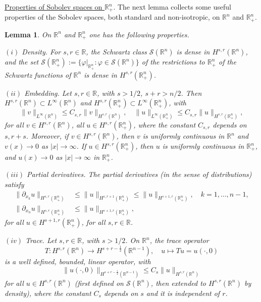 \documentclass[10pt,reqno,a4paper]{article}
\numberwithin{equation}{section}
\theoremstyle{plain}
\newtheorem{lemma}[theorem]{Lemma}
\theoremstyle{definition}
\newcommand{\R}{{\mathbb R}}
\newcommand{\mS}{\mathcal{S}}
\newcommand{\ph}{\varphi}
\newcommand{\pa}{\partial}
\begin{document}
\medskip


\underline{Properties of Sobolev spaces on $\R^n_+$}. 
The next lemma collects some useful properties of the Sobolev spaces, both standard and non-isotropic, 
on $\R^n$ and $\R^n_+$. 


\begin{lemma} \label{lemma:est.tools.R.n.+} 
On $\R^n$ and $\R^n_+$ one has the following properties.

$(i)$ \emph{Density}. 
For $s,r \in \R$, the Schwartz class $\mS(\R^n)$ is dense in $H^{s,r}(\R^n)$, 
and the set $\mS(\R^n_+) := \{ \ph |_{\R^n_+} : \ph \in \mS(\R^n) \}$ 
of the restrictions to $\R^n_+$ of the Schwartz functions of $\R^n$ 
is dense in $H^{s,r}(\R^n_+)$. 

$(ii)$ \emph{Embedding}. 
Let $s,r \in \R$, with $s > 1/2$, $s+r > n/2$. 
Then $H^{s,r}(\R^n) \subset L^\infty(\R^n)$ and 
$H^{s,r}(\R^n_+) \subset L^\infty(\R^n_+)$, with 
\begin{equation} \label{embedding.ineq}
\| v \|_{L^\infty(\R^n)} \leq C_{s,r} \| v \|_{H^{s,r}(\R^n)}, 
\quad 
\| u \|_{L^\infty(\R^n_+)} \leq C_{s,r} \| u \|_{H^{s,r}(\R^n_+)},
\end{equation}
for all $v \in H^{s,r}(\R^n)$, 
all $u \in H^{s,r}(\R^n_+)$, 
where the constant $C_{s,r}$ depends on $s,r+s$. 
Moreover, if $v \in H^{s,r}(\R^n)$, then $v$ is uniformly continuous in $\R^n$  
and $v(x) \to 0$ as $|x| \to \infty$.  
If $u \in H^{s,r}(\R^n_+)$, then $u$ is uniformly continuous in $\R^n_+$, 
and $u(x) \to 0$ as $|x| \to \infty$ in $\R^n_+$.  

$(iii)$ \emph{Partial derivatives}. 
The partial derivatives (in the sense of distributions) satisfy
\begin{align} 
\| \pa_{x_k} u \|_{H^{s,r}(\R^n_+)} 
& \leq \| u \|_{H^{s,r+1}(\R^n_+)} 
\leq \| u \|_{H^{s+1,r}(\R^n_+)}, 
\quad k=1, \ldots, n-1,
\label{pa.k.est}
\\
\| \pa_{x_n} u \|_{H^{s,r}(\R^n_+)} 
& \leq \| u \|_{H^{s+1,r}(\R^n_+)},
\label{pa.n.est}
\end{align} 
for all $u \in H^{s+1,r}(\R^n_+)$, for all $s,r \in \R$. 

$(iv)$ \emph{Trace}. 
Let $s,r \in \R$, with $s > 1/2$. 
On $\R^n$, the trace operator 
\begin{equation} \label{def.trace.H.s.r.R.n}
T : H^{s,r}(\R^n) \to H^{s+r-\frac12}(\R^{n-1}), 
\quad 
u \mapsto T u = u(\cdot, 0)
\end{equation}
is a well defined, bounded, linear operator, with 
\begin{equation} \label{trace.est.R.n}
\| u(\cdot , 0) \|_{ H^{s+r-\frac12}(\R^{n-1}) } 
\leq C_s \| u \|_{ H^{s,r}(\R^n) }
\end{equation}
for all $u \in H^{s,r}(\R^n)$ 
(first defined on $\mS(\R^n)$, then extended to $H^{s,r}(\R^n)$ by density),
where the constant $C_s$ depends on $s$ and it is independent of $r$.  


\end{lemma}
\end{document}
